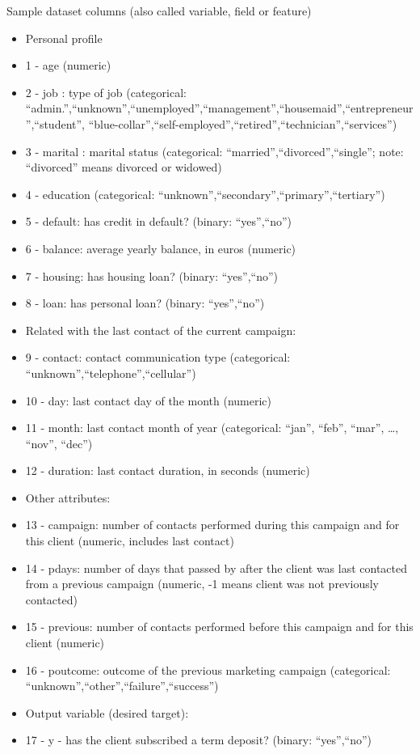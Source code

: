 \documentclass[
  10pt,
  ignorenonframetext,
  serif]{beamer}
\begin{document}
\begin{frame}{Sample dataset columns (also called variable, field or
feature)}
\protect\hypertarget{sample-dataset-columns-also-called-variable-field-or-feature}{}
\begin{itemize}
\item
  Personal profile
\item
  1 - age (numeric)
\item
  2 - job : type of job (categorical:
  ``admin.'',``unknown'',``unemployed'',``management'',``housemaid'',``entrepreneur'',``student'',
  ``blue-collar'',``self-employed'',``retired'',``technician'',``services'')
\item
  3 - marital : marital status (categorical:
  ``married'',``divorced'',``single''; note: ``divorced'' means divorced
  or widowed)
\item
  4 - education (categorical:
  ``unknown'',``secondary'',``primary'',``tertiary'')
\item
  5 - default: has credit in default? (binary: ``yes'',``no'')
\item
  6 - balance: average yearly balance, in euros (numeric)
\item
  7 - housing: has housing loan? (binary: ``yes'',``no'')
\item
  8 - loan: has personal loan? (binary: ``yes'',``no'')
\item
  Related with the last contact of the current campaign:
\item
  9 - contact: contact communication type (categorical:
  ``unknown'',``telephone'',``cellular'')
\item
  10 - day: last contact day of the month (numeric)
\item
  11 - month: last contact month of year (categorical: ``jan'', ``feb'',
  ``mar'', \ldots, ``nov'', ``dec'')
\item
  12 - duration: last contact duration, in seconds (numeric)
\item
  Other attributes:
\item
  13 - campaign: number of contacts performed during this campaign and
  for this client (numeric, includes last contact)
\item
  14 - pdays: number of days that passed by after the client was last
  contacted from a previous campaign (numeric, -1 means client was not
  previously contacted)
\item
  15 - previous: number of contacts performed before this campaign and
  for this client (numeric)
\item
  16 - poutcome: outcome of the previous marketing campaign
  (categorical: ``unknown'',``other'',``failure'',``success'')
\item
  Output variable (desired target):
\item
  17 - y - has the client subscribed a term deposit? (binary:
  ``yes'',``no'')
\end{itemize}
\end{frame}
\end{document}
